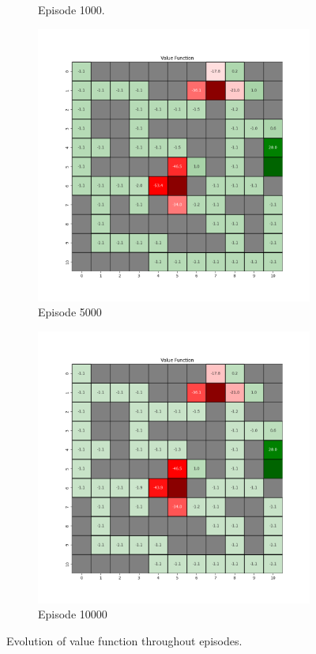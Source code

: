\documentclass{assignment}
\begin{document}
\begin{figure}[H]
\begin{subfigure}{0.3\textwidth}
    \caption{Episode 1000.}
    \end{subfigure}\hfill
    \begin{subfigure}{0.3\textwidth}
        \includegraphics[width=\textwidth]{figures/value_td/gamma_sweep/value_function_alpha_0.1_gamma_0.1_epsilon_0.2_iteration_5000.png}
    \caption{Episode 5000}
    \end{subfigure}\hfill
    \begin{subfigure}{0.3\textwidth}
        \includegraphics[width=\textwidth]{figures/value_td/gamma_sweep/value_function_alpha_0.1_gamma_0.1_epsilon_0.2_iteration_10000.png}
    \caption{Episode 10000}
    \end{subfigure}
    \caption{Evolution of value function throughout episodes.}
    \label{fig:gamma_0.1_td_learning_value}
\end{figure}
\end{document}
